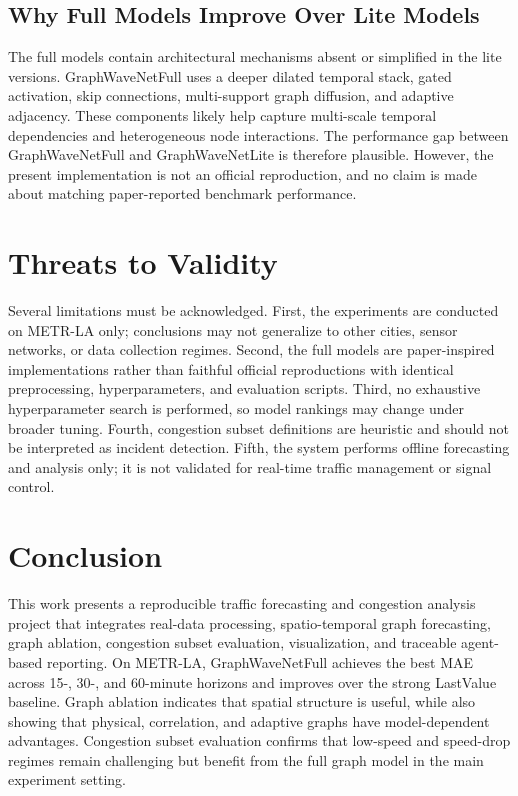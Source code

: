 \documentclass[11pt]{article}
\begin{document}
\subsection{Why Full Models Improve Over Lite Models}
The full models contain architectural mechanisms absent or simplified in the lite versions. GraphWaveNetFull uses a deeper dilated temporal stack, gated activation, skip connections, multi-support graph diffusion, and adaptive adjacency. These components likely help capture multi-scale temporal dependencies and heterogeneous node interactions. The performance gap between GraphWaveNetFull and GraphWaveNetLite is therefore plausible. However, the present implementation is not an official reproduction, and no claim is made about matching paper-reported benchmark performance.

\section{Threats to Validity}
Several limitations must be acknowledged. First, the experiments are conducted on METR-LA only; conclusions may not generalize to other cities, sensor networks, or data collection regimes. Second, the full models are paper-inspired implementations rather than faithful official reproductions with identical preprocessing, hyperparameters, and evaluation scripts. Third, no exhaustive hyperparameter search is performed, so model rankings may change under broader tuning. Fourth, congestion subset definitions are heuristic and should not be interpreted as incident detection. Fifth, the system performs offline forecasting and analysis only; it is not validated for real-time traffic management or signal control.

\section{Conclusion}
This work presents a reproducible traffic forecasting and congestion analysis project that integrates real-data processing, spatio-temporal graph forecasting, graph ablation, congestion subset evaluation, visualization, and traceable agent-based reporting. On METR-LA, GraphWaveNetFull achieves the best MAE across 15-, 30-, and 60-minute horizons and improves over the strong LastValue baseline. Graph ablation indicates that spatial structure is useful, while also showing that physical, correlation, and adaptive graphs have model-dependent advantages. Congestion subset evaluation confirms that low-speed and speed-drop regimes remain challenging but benefit from the full graph model in the main experiment setting.
\end{document}
